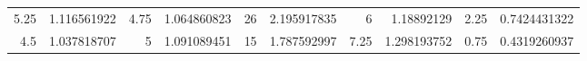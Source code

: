 \begin{tabular}{rrrrrrrrrr}
5.25 & 1.116561922 & 4.75 & 1.064860823 & 26 & 2.195917835 & 6 & 1.18892129 & 2.25 & 0.7424431322 \\
4.5 & 1.037818707 & 5 & 1.091089451 & 15 & 1.787592997 & 7.25 & 1.298193752 & 0.75 & 0.4319260937 \\
\end{tabular}
